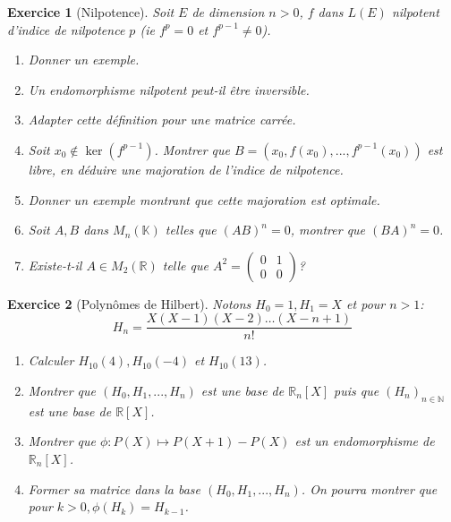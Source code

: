 \documentclass[12pt,a4paper]{article}
\newcommand{\R}{\mathbb{R}}
\newcommand{\N}{\mathbb{N}}
\newcommand{\K}{\mathbb{K} }
\theoremstyle{break}
\theoremstyle{break}
\newtheorem{Exo}{Exercice}
\begin{document}
%

\begin{Exo}[Nilpotence]
Soit $E$ de dimension $n>0$, $f$ dans $L(E)$ nilpotent d'indice de nilpotence $p$ (ie $f^p=0$ et $f^{p-1}\neq 0$).

\begin{enumerate}
	\item Donner un exemple.
	\item Un endomorphisme nilpotent peut-il être inversible.
	\item Adapter cette définition pour une matrice carrée.
	\item
	Soit $x_0\notin\ker(f^{p-1})$. Montrer que $B=\left(x_0,f(x_0),...,f^{p-1}(x_0)\right)$ est libre, en déduire une majoration de l'indice de nilpotence.
	\item
	Donner un exemple montrant que cette majoration est optimale.
	\item Soit $A,B$ dans $M_n(\K)$ telles que $(AB)^n=0$, montrer que $(BA)^n=0$.
	\item Existe-t-il $A\in M_2(\R)$ telle que $A^2=\begin{pmatrix}
	0 & 1 \\
	0 & 0
	\end{pmatrix}$?
	 
\end{enumerate}

\end{Exo}

\begin{Exo}[Polynômes de Hilbert]
	Notons $H_0=1,H_1=X$ et pour $n>1$:$$H_{n}=\frac {X \left( X-1\right) \left( X-2\right) \ldots \left( X-n+1\right) } {n!}$$
	\begin{enumerate}
		\item
		Calculer $H_{10}(4),H_{10}(-4)$ et $H_{10}(13)$.
		\item
		Montrer que $(H_0,H_1,...,H_n)$ est une base de $\R_n[X]$ puis que $(H_n)_{n\in\N}$ est une base de $\R[X]$.
		\item
		Montrer que $\phi:P(X)\mapsto P(X+1)-P(X)$ est un endomorphisme de $\R_n[X]$.
		\item
		Former sa matrice  dans la base $(H_0,H_1,...,H_n)$. On pourra montrer que pour $k>0,\phi(H_k)=H_{k-1}$.
	\end{enumerate}
\end{Exo}
\end{document}
